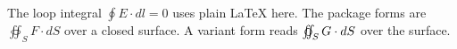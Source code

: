 \documentclass{article}
\begin{document}
The loop integral $\oint E \cdot dl = 0$ uses plain LaTeX here.
The package forms are $\oiint_S F \cdot dS$ over a closed surface.
A variant form reads $\varoiint_S G \cdot dS$ over the surface.
\end{document}
